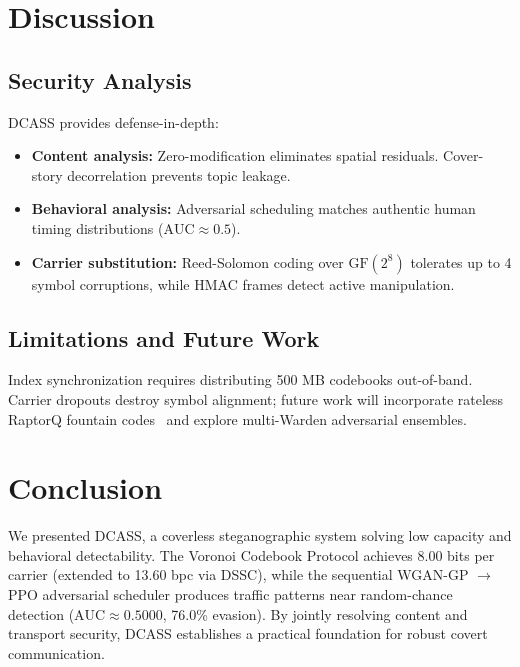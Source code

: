 \documentclass[conference]{IEEEtran}
\begin{document}
\section{Discussion}

\subsection{Security Analysis}
DCASS provides defense-in-depth:
\begin{itemize}
    \item \textbf{Content analysis:} Zero-modification eliminates spatial residuals. Cover-story decorrelation prevents topic leakage.
    \item \textbf{Behavioral analysis:} Adversarial scheduling matches authentic human timing distributions ($\text{AUC} \approx 0.5$).
    \item \textbf{Carrier substitution:} Reed-Solomon coding over $\text{GF}(2^8)$ tolerates up to 4 symbol corruptions, while HMAC frames detect active manipulation.
\end{itemize}

\subsection{Limitations and Future Work}
Index synchronization requires distributing 500 MB codebooks out-of-band. Carrier dropouts destroy symbol alignment; future work will incorporate rateless RaptorQ fountain codes~\cite{luby2002lt} and explore multi-Warden adversarial ensembles.

\section{Conclusion}

We presented DCASS, a coverless steganographic system solving low capacity and behavioral detectability. The Voronoi Codebook Protocol achieves 8.00 bits per carrier (extended to 13.60 bpc via DSSC), while the sequential WGAN-GP $\to$ PPO adversarial scheduler produces traffic patterns near random-chance detection ($\text{AUC} \approx 0.5000$, 76.0\% evasion). By jointly resolving content and transport security, DCASS establishes a practical foundation for robust covert communication.



\end{document}
